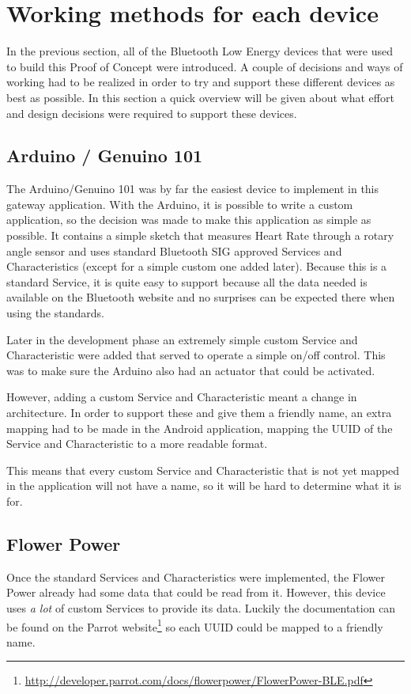 \documentclass[pdftex,a4paper,12pt,twoside]{report}
\begin{document}
\section{Working methods for each device}
\label{sec:achievements}
In the previous section, all of the Bluetooth Low Energy devices that were used to build this Proof of Concept were introduced. A couple of decisions and ways of working had to be realized in order to try and support these different devices as best as possible. In this section a quick overview will be given about what effort and design decisions were required to support these devices.

\subsection{Arduino / Genuino 101}
\label{subsec:achievementsarduino101}
The Arduino/Genuino 101 was by far the easiest device to implement in this gateway application. With the Arduino, it is possible to write a custom application, so the decision was made to make this application as simple as possible. It contains a simple sketch that measures Heart Rate through a rotary angle sensor and uses standard Bluetooth SIG approved Services and Characteristics (except for a simple custom one added later). Because this is a standard Service, it is quite easy to support because all the data needed is available on the Bluetooth website and no surprises can be expected there when using the standards.

Later in the development phase an extremely simple custom Service and Characteristic were added that served to operate a simple on/off control. This was to make sure the Arduino also had an actuator that could be activated.

However, adding a custom Service and Characteristic meant a change in architecture. In order to support these and give them a friendly name, an extra mapping had to be made in the Android application, mapping the UUID of the Service and Characteristic to a more readable format.

This means that every custom Service and Characteristic that is not yet mapped in the application will not have a name, so it will be hard to determine what it is for.

\subsection{Flower Power}
\label{subsec:achievementsflowerpower}
Once the standard Services and Characteristics were implemented, the Flower Power already had some data that could be read from it. However, this device uses \textit{a lot} of custom Services to provide its data. Luckily the documentation can be found on the Parrot website\footnote{\url{http://developer.parrot.com/docs/flowerpower/FlowerPower-BLE.pdf}} so each UUID could be mapped to a friendly name.
\end{document}
